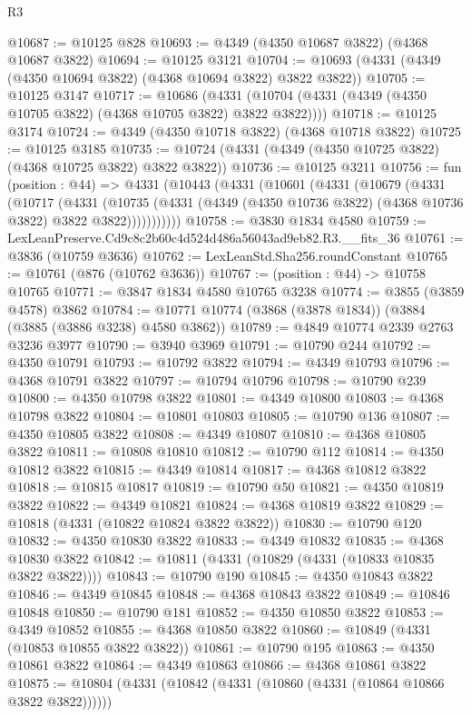\begin{lexlean}{R3}
\begin{coremodule}
@10687 := @10125 @828
@10693 := @4349 (@4350 @10687 @3822) (@4368 @10687 @3822)
@10694 := @10125 @3121
@10704 := @10693 (@4331 (@4349 (@4350 @10694 @3822) (@4368 @10694 @3822) @3822 @3822))
@10705 := @10125 @3147
@10717 := @10686
    (@4331 (@10704 (@4331 (@4349 (@4350 @10705 @3822) (@4368 @10705 @3822) @3822 @3822))))
@10718 := @10125 @3174
@10724 := @4349 (@4350 @10718 @3822) (@4368 @10718 @3822)
@10725 := @10125 @3185
@10735 := @10724 (@4331 (@4349 (@4350 @10725 @3822) (@4368 @10725 @3822) @3822 @3822))
@10736 := @10125 @3211
@10756 := fun (position : @44) =>
  @4331
    (@10443
      (@4331
        (@10601
          (@4331
            (@10679
              (@4331
                (@10717
                  (@4331
                    (@10735
                      (@4331 (@4349 (@4350 @10736 @3822) (@4368 @10736 @3822) @3822 @3822)))))))))))
@10758 := @3830 @1834 @4580
@10759 := LexLeanPreserve.Cd9c8c2b60c4d524d486a56043ad9eb82.R3.__fits_36
@10761 := @3836 (@10759 @3636)
@10762 := LexLeanStd.Sha256.roundConstant
@10765 := @10761 (@876 (@10762 @3636))
@10767 := (position : @44) -> @10758 @10765
@10771 := @3847 @1834 @4580 @10765 @3238
@10774 := @3855 (@3859 @4578) @3862
@10784 := @10771 @10774 (@3868 (@3878 @1834)) (@3884 (@3885 (@3886 @3238) @4580 @3862))
@10789 := @4849 @10774 @2339 @2763 @3236 @3977
@10790 := @3940 @3969
@10791 := @10790 @244
@10792 := @4350 @10791
@10793 := @10792 @3822
@10794 := @4349 @10793
@10796 := @4368 @10791 @3822
@10797 := @10794 @10796
@10798 := @10790 @239
@10800 := @4350 @10798 @3822
@10801 := @4349 @10800
@10803 := @4368 @10798 @3822
@10804 := @10801 @10803
@10805 := @10790 @136
@10807 := @4350 @10805 @3822
@10808 := @4349 @10807
@10810 := @4368 @10805 @3822
@10811 := @10808 @10810
@10812 := @10790 @112
@10814 := @4350 @10812 @3822
@10815 := @4349 @10814
@10817 := @4368 @10812 @3822
@10818 := @10815 @10817
@10819 := @10790 @50
@10821 := @4350 @10819 @3822
@10822 := @4349 @10821
@10824 := @4368 @10819 @3822
@10829 := @10818 (@4331 (@10822 @10824 @3822 @3822))
@10830 := @10790 @120
@10832 := @4350 @10830 @3822
@10833 := @4349 @10832
@10835 := @4368 @10830 @3822
@10842 := @10811 (@4331 (@10829 (@4331 (@10833 @10835 @3822 @3822))))
@10843 := @10790 @190
@10845 := @4350 @10843 @3822
@10846 := @4349 @10845
@10848 := @4368 @10843 @3822
@10849 := @10846 @10848
@10850 := @10790 @181
@10852 := @4350 @10850 @3822
@10853 := @4349 @10852
@10855 := @4368 @10850 @3822
@10860 := @10849 (@4331 (@10853 @10855 @3822 @3822))
@10861 := @10790 @195
@10863 := @4350 @10861 @3822
@10864 := @4349 @10863
@10866 := @4368 @10861 @3822
@10875 := @10804 (@4331 (@10842 (@4331 (@10860 (@4331 (@10864 @10866 @3822 @3822))))))

\end{coremodule}
\end{lexlean}
